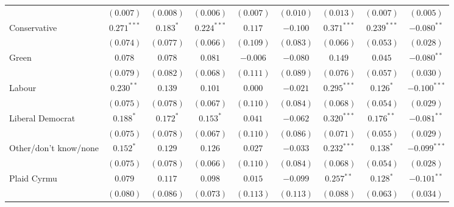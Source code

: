 \documentclass[12pt, letter]{article}
\begin{document}
\begin{table}
\begin{center}
{\begin{tabular}{l c c c c c c c c }
                                 & $(0.007)$      & $(0.008)$      & $(0.006)$      & $(0.007)$      & $(0.010)$      & $(0.013)$      & $(0.007)$      & $(0.005)$      \\
Conservative                     & $0.271^{***}$  & $0.183^{*}$    & $0.224^{***}$  & $0.117$        & $-0.100$       & $0.371^{***}$  & $0.239^{***}$  & $-0.080^{**}$  \\
                                 & $(0.074)$      & $(0.077)$      & $(0.066)$      & $(0.109)$      & $(0.083)$      & $(0.066)$      & $(0.053)$      & $(0.028)$      \\
Green                            & $0.078$        & $0.078$        & $0.081$        & $-0.006$       & $-0.080$       & $0.149$        & $0.045$        & $-0.080^{**}$  \\
                                 & $(0.079)$      & $(0.082)$      & $(0.068)$      & $(0.111)$      & $(0.089)$      & $(0.076)$      & $(0.057)$      & $(0.030)$      \\
Labour                           & $0.230^{**}$   & $0.139$        & $0.101$        & $0.000$        & $-0.021$       & $0.295^{***}$  & $0.126^{*}$    & $-0.100^{***}$ \\
                                 & $(0.075)$      & $(0.078)$      & $(0.067)$      & $(0.110)$      & $(0.084)$      & $(0.068)$      & $(0.054)$      & $(0.029)$      \\
Liberal Democrat                 & $0.188^{*}$    & $0.172^{*}$    & $0.153^{*}$    & $0.041$        & $-0.062$       & $0.320^{***}$  & $0.176^{**}$   & $-0.081^{**}$  \\
                                 & $(0.075)$      & $(0.078)$      & $(0.067)$      & $(0.110)$      & $(0.086)$      & $(0.071)$      & $(0.055)$      & $(0.029)$      \\
Other/don't know/none            & $0.152^{*}$    & $0.129$        & $0.126$        & $0.027$        & $-0.033$       & $0.232^{***}$  & $0.138^{*}$    & $-0.099^{***}$ \\
                                 & $(0.075)$      & $(0.078)$      & $(0.066)$      & $(0.110)$      & $(0.084)$      & $(0.068)$      & $(0.054)$      & $(0.028)$      \\
Plaid Cyrmu                      & $0.079$        & $0.117$        & $0.098$        & $0.015$        & $-0.099$       & $0.257^{**}$   & $0.128^{*}$    & $-0.101^{**}$  \\
                                 & $(0.080)$      & $(0.086)$      & $(0.073)$      & $(0.113)$      & $(0.113)$      & $(0.088)$      & $(0.063)$      & $(0.034)$      \\

\end{tabular}}
\end{center}
\end{table}
\end{document}
